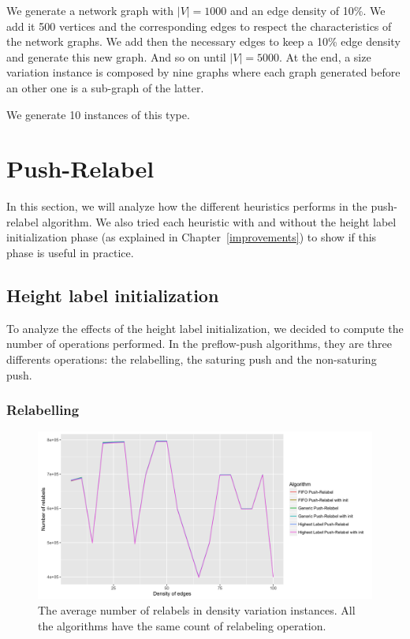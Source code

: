 We generate a network graph with $|V|=1000$ and an edge density of 10\%. We add it 500 vertices and the corresponding edges to respect the characteristics of the network graphs. We add then the necessary edges to keep a 10\% edge density and generate this new graph. And so on until $|V|=5000$. At the end, a size variation instance is composed by nine graphs where each graph generated before an other one is a sub-graph of the latter.

We generate 10 instances of this type.

\section{Push-Relabel}
In this section, we will analyze how the different heuristics performs in the push-relabel algorithm. We also tried each heuristic with and without the height label initialization phase (as explained in Chapter~\ref{improvements}) to show if this phase is useful in practice.
\subsection{Height label initialization}

To analyze the effects of the height label initialization, we decided to compute the number of operations performed. In the preflow-push algorithms, they are three differents operations: the relabelling, the saturing push and the non-saturing push.

\subsubsection{Relabelling}
\begin{figure}[H]
\begin{center}
\includegraphics[scale=0.13]{images/meanrelabels.png}
\caption{The average number of relabels in density variation instances. All the algorithms have the same count of relabeling operation.}
\label{fig:mean_relabel}
\end{center}
\end{figure}

